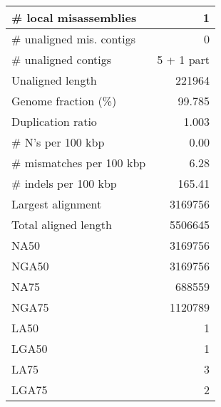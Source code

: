 \documentclass[12pt,a4paper]{article}
\begin{document}
\begin{table}[ht]
\begin{center}
\begin{tabular}{|l*{1}{|r}|}
\# local misassemblies & 1 \\ \hline
\# unaligned mis. contigs & 0 \\ \hline
\# unaligned contigs & 5 + 1 part \\ \hline
Unaligned length & 221964 \\ \hline
Genome fraction (\%) & 99.785 \\ \hline
Duplication ratio & 1.003 \\ \hline
\# N's per 100 kbp & 0.00 \\ \hline
\# mismatches per 100 kbp & 6.28 \\ \hline
\# indels per 100 kbp & 165.41 \\ \hline
Largest alignment & 3169756 \\ \hline
Total aligned length & 5506645 \\ \hline
NA50 & 3169756 \\ \hline
NGA50 & 3169756 \\ \hline
NA75 & 688559 \\ \hline
NGA75 & 1120789 \\ \hline
LA50 & 1 \\ \hline
LGA50 & 1 \\ \hline
LA75 & 3 \\ \hline
LGA75 & 2 \\ \hline
\end{tabular}
\end{center}
\end{table}
\end{document}
